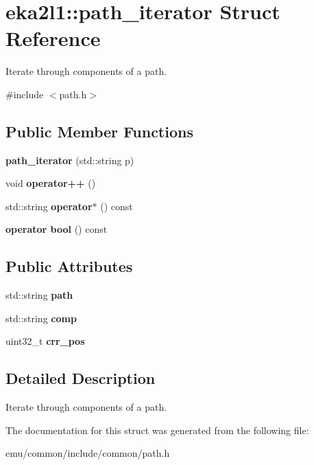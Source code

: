 \hypertarget{structeka2l1_1_1path__iterator}{}\section{eka2l1\+:\+:path\+\_\+iterator Struct Reference}
\label{structeka2l1_1_1path__iterator}


Iterate through components of a path.  




{\ttfamily \#include $<$path.\+h$>$}

\subsection*{Public Member Functions}
\begin{DoxyCompactItemize}
\item 
\mbox{\label{structeka2l1_1_1path__iterator_abfac49f199890c0aba549638e9ad54eb}} 
{\bfseries path\+\_\+iterator} (std\+::string p)
\item 
\mbox{\label{structeka2l1_1_1path__iterator_a364fee806f1549f9013cfe9f2d38dfaf}} 
void {\bfseries operator++} ()
\item 
\mbox{\label{structeka2l1_1_1path__iterator_a073020ba3030808efcfd4bf9fa384293}} 
std\+::string {\bfseries operator$\ast$} () const
\item 
\mbox{\label{structeka2l1_1_1path__iterator_a1440f275677f6ae42fd9bbb17584e3ba}} 
{\bfseries operator bool} () const
\end{DoxyCompactItemize}
\subsection*{Public Attributes}
\begin{DoxyCompactItemize}
\item 
\mbox{\label{structeka2l1_1_1path__iterator_ae0743edd4ee08d5e5c572e89d822aa8e}} 
std\+::string {\bfseries path}
\item 
\mbox{\label{structeka2l1_1_1path__iterator_a0b171379add3393de3f258738db01bab}} 
std\+::string {\bfseries comp}
\item 
\mbox{\label{structeka2l1_1_1path__iterator_a428fbc2f0c99878d231323390f5419e8}} 
uint32\+\_\+t {\bfseries crr\+\_\+pos}
\end{DoxyCompactItemize}


\subsection{Detailed Description}
Iterate through components of a path. 

The documentation for this struct was generated from the following file\+:\begin{DoxyCompactItemize}
\item 
emu/common/include/common/path.\+h\end{DoxyCompactItemize}
